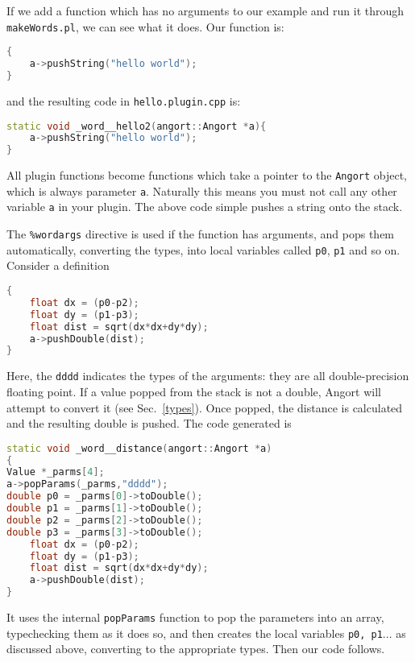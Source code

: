 If we add a function which has no arguments to our example
and run it through \texttt{makeWords.pl}, we can see what it does.
Our function is:
\begin{lstlisting}[language=c++]
%word hello2 (-- string) a test
{
    a->pushString("hello world");
}
\end{lstlisting}
and the resulting code in \texttt{hello.plugin.cpp} is:
\begin{lstlisting}[language=c++]
static void _word__hello2(angort::Angort *a){
    a->pushString("hello world");
}
\end{lstlisting}
All plugin functions become functions which take a pointer to the
\texttt{Angort} object, which is always parameter \texttt{a}. Naturally
this means you must not call any other variable \texttt{a} in your
plugin. The above code simple pushes a string onto the stack.

The \texttt{\%wordargs} directive is used if the function has arguments,
and pops them automatically, converting the types, into local variables
called \texttt{p0}, \texttt{p1} and so on. Consider a definition

\begin{lstlisting}[language=c++]
%wordargs distance dddd (x1 y1 x2 y2 -- dist)
{
    float dx = (p0-p2);
    float dy = (p1-p3);
    float dist = sqrt(dx*dx+dy*dy);
    a->pushDouble(dist);
}
\end{lstlisting}
Here, the \texttt{dddd} indicates the types of the arguments: they
are all double-precision floating point.
If a value popped from the stack is not a double,
Angort will attempt to convert it (see Sec.~\ref{types}).
Once popped, the distance is calculated and the resulting double
is pushed. The code generated is
\begin{lstlisting}[language=c++]
static void _word__distance(angort::Angort *a)
{
Value *_parms[4];
a->popParams(_parms,"dddd");
double p0 = _parms[0]->toDouble();
double p1 = _parms[1]->toDouble();
double p2 = _parms[2]->toDouble();
double p3 = _parms[3]->toDouble();
    float dx = (p0-p2);
    float dy = (p1-p3);
    float dist = sqrt(dx*dx+dy*dy);
    a->pushDouble(dist);
}
\end{lstlisting}
It uses the internal \texttt{popParams} function to pop the parameters
into an array, typechecking them as it does so, and then creates the
local variables \texttt{p0, p1}... as discussed above, converting
to the appropriate types. Then our code follows.


